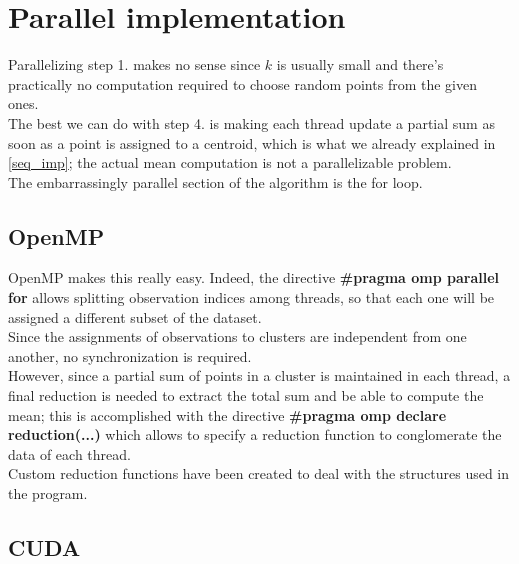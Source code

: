 \documentclass[10pt,twocolumn,letterpaper]{article}
\begin{document}
\section{Parallel implementation}
Parallelizing step 1. makes no sense since $k$ is usually small and there's practically no computation required to choose random points from the given ones.\\
The best we can do with step 4. is making each thread update a partial sum as soon as a point is assigned to a centroid, which is what we already explained in \cref{seq_imp}; the actual mean computation is not a parallelizable problem.\\
The embarrassingly parallel section of the algorithm is the for loop.
\subsection{OpenMP}
OpenMP makes this really easy. Indeed, the directive \textbf{\#pragma omp parallel for} allows splitting observation indices among threads, so that each one will be assigned a different subset of the dataset.\\
Since the assignments of observations to clusters are independent from one another, no synchronization is required.\\
However, since a partial sum of points in a cluster is maintained in each thread, a final reduction is needed to extract the total sum and be able to compute the mean; this is accomplished with the directive \textbf{\#pragma omp declare reduction(...)} which allows to specify a reduction function to conglomerate the data of each thread.\\
Custom reduction functions have been created to deal with the structures used in the program.
\subsection{CUDA}
\end{document}
